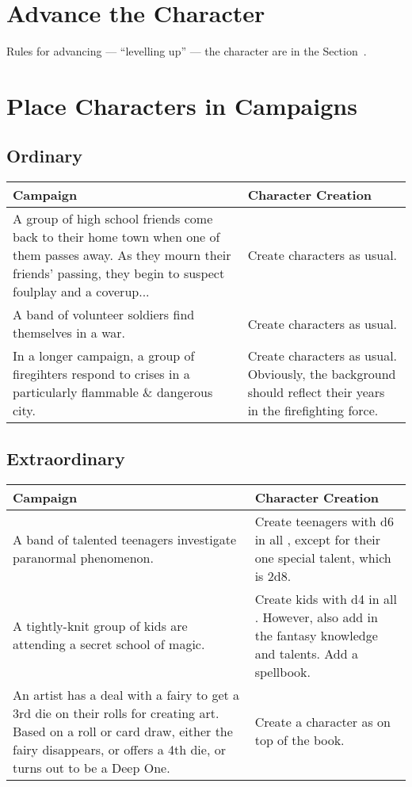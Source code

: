 \section{Advance the Character}

Rules for advancing --- ``levelling up'' --- the character are in the
Section~.


\section{Place Characters in Campaigns}
\subsection{Ordinary}
\begin{center}
	\begin{xltabular}{\textwidth}{XX}
		Campaign & Character Creation \\
		\hline
		A group of high school friends come back to their home town when one of them passes away. As they mourn their friends' passing, they begin to suspect foulplay and a coverup... & Create characters as usual. \\
		A band of volunteer soldiers find themselves in a war. & Create characters as usual. \\
		In a longer campaign, a group of firegihters respond to crises in a particularly flammable \& dangerous city. & Create characters as usual. Obviously, the background should reflect their years in the firefighting force. \\
	\end{xltabular}
\end{center}


\subsection{Extraordinary}
\begin{center}
	\begin{xltabular}{\textwidth}{XX}
		Campaign & Character Creation \\
		\hline
		A band of talented teenagers investigate paranormal phenomenon.
			& Create teenagers with d6 in all , except for their one special talent, which is 2d8.\\
   		A tightly-knit group of kids are attending a secret school of magic.
			& Create kids with d4 in all . However, also add in the fantasy knowledge and talents. Add a spellbook. \\
		An artist has a deal with a fairy to get a 3rd die on their  rolls for creating art.
			Based on a roll or card draw, either the fairy disappears, or offers a 4th die, or turns out to be a Deep One.
			& Create a  character as on top of the book. \\
	\end{xltabular}
\end{center}

